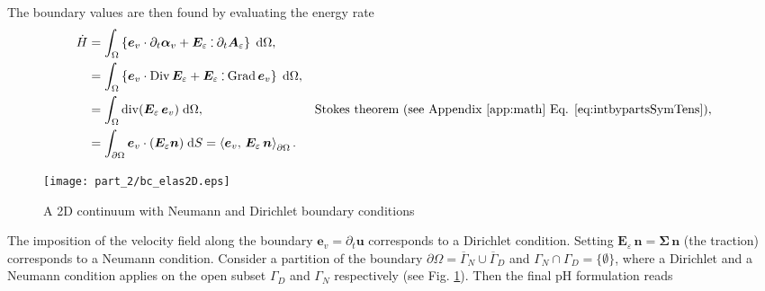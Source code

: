 The boundary values are then found by evaluating the energy rate
\begin{equation}\label{eq:enrateElas}
\begin{aligned}
\dot{H} &= \int_{\Omega} \left\{ \bm{e}_v \cdot \partial_t \bm\alpha_v + \bm{E}_\varepsilon \cddot \partial_t \bm{A}_\varepsilon \right\} \d\Omega, \\
&= \int_{\Omega} \left\{\bm{e}_v \cdot \Div \bm{E}_\varepsilon + \bm{E}_\varepsilon \cddot \Grad \bm{e}_v \right\}\d\Omega,\\
&= \int_{\Omega} \div(\bm{E}_\varepsilon \, \bm{e}_v) \d\Omega, \qquad &\text{Stokes theorem (see  Appendix \ref{app:math} Eq. \eqref{eq:intbypartsSymTens}}), \\
&= \int_{\partial \Omega} \bm{e}_v \cdot (\bm{E}_\varepsilon\bm{n}) \d{S} = \inner[\partial\Omega]{\bm{e}_v}{\bm{E}_\varepsilon \, \bm{n}}.
\end{aligned}
\end{equation}

\begin{figure}
\centering
\texttt{[image: part\_2/bc\_elas2D.eps]}
\caption{A 2D continuum with Neumann and Dirichlet boundary conditions}
\label{fig:bc_elas2D}
\end{figure}
The imposition of the velocity field along the boundary $\bm{e}_v = \partial_t \bm{u}$ corresponds to a Dirichlet condition. Setting $\bm{E}_\varepsilon \, \bm{n} = \bm{\Sigma} \,  \bm{n}$ (the traction) corresponds to a Neumann condition. Consider a partition of the boundary $\partial\Omega = \overline{\Gamma}_N \cup \overline{\Gamma}_D$ and $\Gamma_N \cap \Gamma_D =  \{\emptyset\}$, where a Dirichlet and a Neumann condition applies on the open subset $\Gamma_D$ and $\Gamma_N$ respectively (see Fig. \ref{fig:bc_elas2D}). Then the final pH formulation reads

